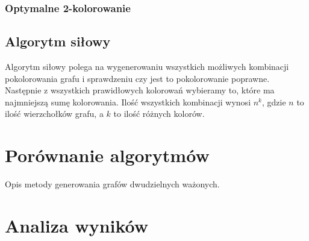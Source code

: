 \documentclass{article}
\begin{document}
\subsubsection*{Optymalne 2-kolorowanie}



\subsection{Algorytm siłowy}

Algorytm siłowy polega na wygenerowaniu wszystkich możliwych kombinacji pokolorowania grafu i sprawdzeniu czy jest to pokolorowanie poprawne. Następnie z wszystkich prawidłowych kolorowań wybieramy to, które ma najmniejszą sumę kolorowania. Ilość wszystkich kombinacji wynosi $n^k$, gdzie $n$ to ilość wierzchołków grafu, a $k$ to ilość różnych kolorów.



\section{Porównanie algorytmów}

Opis metody generowania grafów dwudzielnych ważonych.

\section{Analiza wyników}
\end{document}
